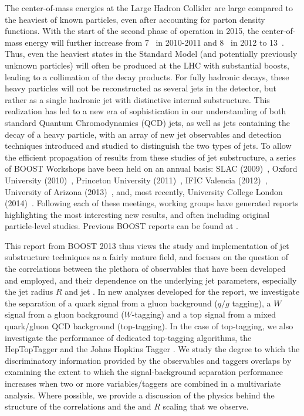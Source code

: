 The center-of-mass energies at the Large Hadron Collider are large compared to the heaviest of known particles, even after accounting for parton density functions. With the start of the second phase of operation in 2015, the center-of-mass energy will further increase from 7~\tev{} in 2010-2011 and 8~\tev{} in 2012 to 13~\tev{}. Thus, even the heaviest states in the Standard Model (and potentially previously unknown particles) will often be produced at the LHC with substantial boosts, leading to a collimation of the decay products.  For fully hadronic decays, these heavy particles will not be reconstructed as several jets in the detector, but rather as a single hadronic jet with distinctive internal substructure.  This realization has led to a new era of sophistication in our understanding of both standard Quantum Chromodynamics (QCD) jets, as well as jets containing the decay of a heavy particle, with an array of new jet observables and detection techniques introduced and studied to distinguish the two types of jets.  To allow the efficient propagation of  results from these studies of jet substructure, a series of BOOST Workshops have been held on an annual basis:
SLAC (2009)~\cite{Boost:2009xx},
Oxford University (2010)~\cite{Boost:2010xx},
Princeton University (2011)~\cite{Boost:2011xx},
IFIC Valencia (2012)~\cite{Boost:2012xx}, 
University of Arizona (2013)~\cite{Boost:2013xx},
and, most recently, University College London (2014)~\cite{Boost:2014xx}.
Following each of these meetings, working groups have generated reports
highlighting the most interesting new results, and often including original particle-level studies. Previous BOOST reports can be found at \cite{Abdesselam:2010pt,Altheimer:2012mn,Altheimer:2013yza}.

This report from BOOST 2013 thus views the study and implementation of jet substructure techniques as a fairly mature field, and focuses on the question of the correlations between the plethora of observables that have been developed and employed, and their dependence on the underlying jet parameters, especially the jet radius $R$ and jet \pt. In new analyses developed for the report, we investigate the separation of a quark signal from a gluon background ($q/g$ tagging), a $W$ signal from a gluon background ($W$-tagging) and a top signal from a mixed quark/gluon QCD background (top-tagging). In the case of top-tagging, we also investigate the performance of dedicated top-tagging algorithms, the HepTopTagger \cite{Plehn:2010st} and the Johns Hopkins Tagger \cite{Kaplan:2008ie}. We study the degree to which the discriminatory information provided by the observables and taggers overlaps by examining the extent to which the signal-background separation performance increases when two or more variables/taggers are combined in a multivariate analysis. Where possible, we provide a discussion of the physics behind the structure of the correlations and the \pt and $R$ scaling that we observe. 



